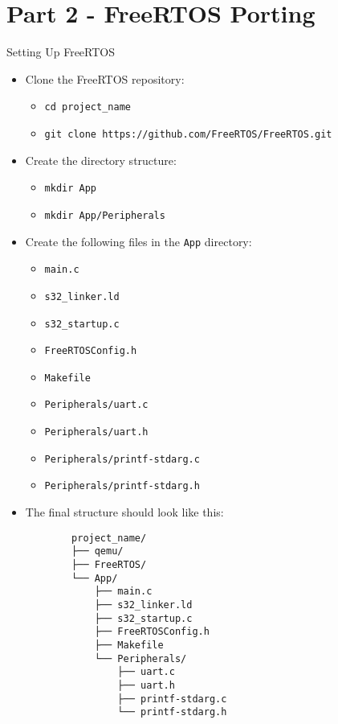 
\section{Part 2 - FreeRTOS Porting}

\begin{frame}{Setting Up FreeRTOS}
    \begin{itemize}
        \item Clone the FreeRTOS repository:
        \begin{itemize}
            \item \texttt{cd project\_name}
            \item \texttt{git clone https://github.com/FreeRTOS/FreeRTOS.git}
        \end{itemize}
        \item Create the directory structure:
        \begin{itemize}
            \item \texttt{mkdir App}
            \item \texttt{mkdir App/Peripherals}
        \end{itemize}
        \item Create the following files in the \texttt{App} directory:
        \begin{itemize}
            \item \texttt{main.c}
            \item \texttt{s32\_linker.ld}
            \item \texttt{s32\_startup.c}
            \item \texttt{FreeRTOSConfig.h}
            \item \texttt{Makefile}
            \item \texttt{Peripherals/uart.c}
            \item \texttt{Peripherals/uart.h}
            \item \texttt{Peripherals/printf-stdarg.c}
            \item \texttt{Peripherals/printf-stdarg.h}
        \end{itemize}
        \item The final structure should look like this:
        \begin{verbatim}
        project_name/
        ├── qemu/
        ├── FreeRTOS/
        └── App/
            ├── main.c
            ├── s32_linker.ld
            ├── s32_startup.c
            ├── FreeRTOSConfig.h
            ├── Makefile
            └── Peripherals/
                ├── uart.c
                ├── uart.h
                ├── printf-stdarg.c
                └── printf-stdarg.h
        \end{verbatim}
    \end{itemize}
\end{frame}

